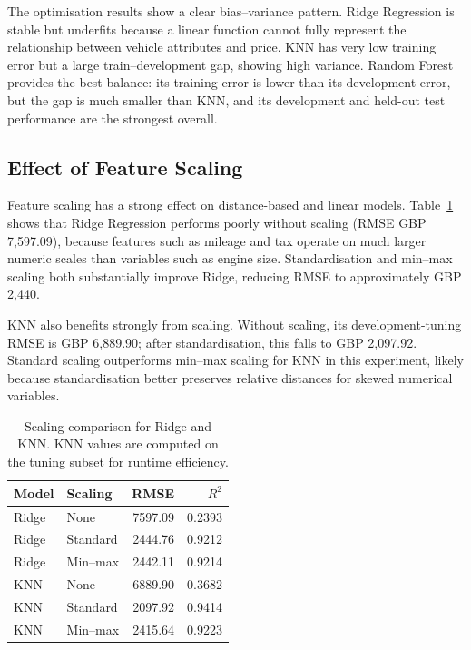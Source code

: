 The optimisation results show a clear bias--variance pattern. Ridge Regression is stable but underfits because a linear function cannot fully represent the relationship between vehicle attributes and price. KNN has very low training error but a large train--development gap, showing high variance. Random Forest provides the best balance: its training error is lower than its development error, but the gap is much smaller than KNN, and its development and held-out test performance are the strongest overall.

\subsection{Effect of Feature Scaling}
\label{sec:scaling_results}

Feature scaling has a strong effect on distance-based and linear models. Table~\ref{tab:scaling_results} shows that Ridge Regression performs poorly without scaling (RMSE GBP 7,597.09), because features such as mileage and tax operate on much larger numeric scales than variables such as engine size. Standardisation and min--max scaling both substantially improve Ridge, reducing RMSE to approximately GBP 2,440.

KNN also benefits strongly from scaling. Without scaling, its development-tuning RMSE is GBP 6,889.90; after standardisation, this falls to GBP 2,097.92. Standard scaling outperforms min--max scaling for KNN in this experiment, likely because standardisation better preserves relative distances for skewed numerical variables.

\begin{table}[h]
\centering
\small
\begin{tabular}{llrr}
\toprule
\textbf{Model} & \textbf{Scaling} & \textbf{RMSE} & \textbf{$R^2$} \\
\midrule
Ridge & None     & 7597.09 & 0.2393 \\
Ridge & Standard & 2444.76 & 0.9212 \\
Ridge & Min--max & 2442.11 & 0.9214 \\
KNN   & None     & 6889.90 & 0.3682 \\
KNN   & Standard & 2097.92 & 0.9414 \\
KNN   & Min--max & 2415.64 & 0.9223 \\
\bottomrule
\end{tabular}
\caption{Scaling comparison for Ridge and KNN. KNN values are computed on the tuning subset for runtime efficiency.}
\label{tab:scaling_results}
\end{table}

